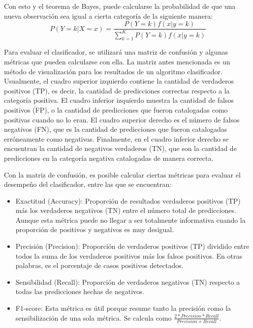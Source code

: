 \documentclass[12pt, letterpaper]{report}
\begin{document}
Con esto y el teorema de Bayes, puede calcularse la probabilidad de que una nueva observación sea igual a cierta categoría de la siguiente manera:
\begin{equation*}
    P(Y=k|X=x)=\frac{P(Y=k)f(x|y=k)}
    {\sum_{k=1}^K P(Y=k)f(x|y=k)}
\end{equation*}

Para evaluar el clasificador, se utilizará una matriz de confusión y algunas métricas que pueden calcularse con ella. La matriz antes mencionada es un método de visualización para los resultados de un algoritmo clasificador. Usualmente, el cuadro superior izquierdo contiene la cantidad de verdaderos positivos (TP), es decir, la cantidad de predicciones correctas respecto a la categoría positiva. El cuadro inferior izquierdo muestra la cantidad de falsos positivos (FP), o la cantidad de predicciones que fueron catalogadas como positivas cuando no lo eran. El cuadro superior derecho es el número de falsos negativos (FN), que es la cantidad de predicciones que fueron catalogadas erróneamente como negativas. Finalmente, en el cuadro inferior derecho se encuentran la cantidad de negativos verdaderos (TN), que son la cantidad de predicciones en la categoría negativa catalogadas de manera correcta. \\ \cite{murel2024}

Con la matriz de confusión, es posible calcular ciertas métricas para evaluar el desempeño del clasificador, entre las que se encuentran:
\begin{itemize}
    \item Exactitud (Accuracy): Proporción de resultados verdaderos positivos (TP) más los verdaderos negativos (TN) entre el número total de predicciones. Aunque esta métrica puede no llegar a ser totalmente informativa cuando la proporción de positivos y negativos es muy desigual.
    \item Precisión (Precision): Proporción de verdaderos positivos (TP) dividido entre todos la suma de los verdaderos positivos más los falsos positivos. En otras palabras, es el porcentaje de casos positivos detectados.
    \item Sensibilidad (Recall): Proporción de verdaderos negativos (TN) respecto a todas las predicciones hechas de negativos.
    \item F1-score: Esta métrica es útil porque resume tanto la precisión como la sensibilización de una sola métrica. Se calcula como $\frac{2*Precision*Recall}{Precision+Recall}$.
\end{itemize}
\end{document}
